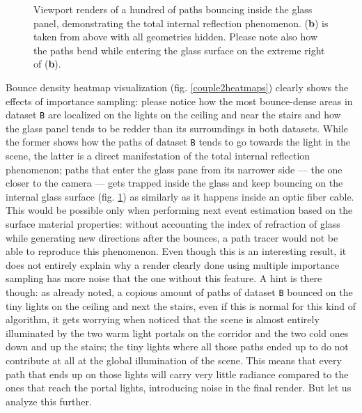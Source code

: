 \begin{figure}
	\caption{Viewport renders of a hundred of paths bouncing inside the glass panel, demonstrating the total internal reflection phenomenon. (\textbf{b}) is taken from above with all geometries hidden. Please note also how the paths bend while entering the glass surface on the extreme right of (\textbf{b}).}
	\label{opticfiber}
\end{figure}

Bounce density heatmap visualization (fig. \ref{couple2heatmaps}) clearly shows the effects of importance sampling: please notice how the most bounce-dense areas in dataset \texttt{B} are localized on the lights on the ceiling and near the stairs and how the glass panel tends to be redder than its surroundings in both datasets. While the former shows how the paths of dataset \texttt{B} tends to go towards the light in the scene, the latter is a direct manifestation of the total internal reflection phenomenon; paths that enter the glass pane from its narrower side --- the one closer to the camera --- gets trapped inside the glass and keep bouncing on the internal glass surface (fig. \ref{opticfiber}) as similarly as it happens inside an optic fiber cable. This would be possible only when performing next event estimation based on the surface material properties: without accounting the index of refraction of glass while generating new directions after the bounces, a path tracer would not be able to reproduce this phenomenon. Even though this is an interesting result, it does not entirely explain why a render clearly done using multiple importance sampling has more noise that the one without this feature. A hint is there though: as already noted, a copious amount of paths of dataset \texttt{B} bounced on the tiny lights on the ceiling and next the stairs, even if this is normal for this kind of algorithm, it gets worrying when noticed that the scene is almost entirely illuminated by the two warm light portals on the corridor and the two cold ones down and up the stairs; the tiny lights where all those paths ended up to do not contribute at all at the global illumination of the scene. This means that every path that ends up on those lights will carry very little radiance compared to the ones that reach the portal lights, introducing noise in the final render. But let us analyze this further.

